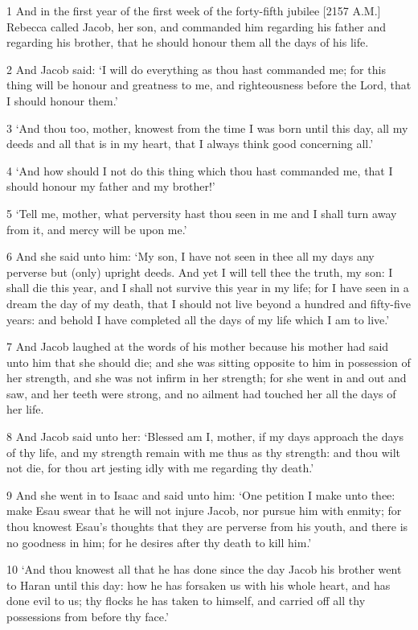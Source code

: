 \par 1 And in the first year of the first week of the forty-fifth jubilee [2157 A.M.] Rebecca called Jacob, her son, and commanded him regarding his father and regarding his brother, that he should honour them all the days of his life.
\par 2 And Jacob said: ‘I will do everything as thou hast commanded me; for this thing will be honour and greatness to me, and righteousness before the Lord, that I should honour them.’
\par 3 ‘And thou too, mother, knowest from the time I was born until this day, all my deeds and all that is in my heart, that I always think good concerning all.’
\par 4 ‘And how should I not do this thing which thou hast commanded me, that I should honour my father and my brother!’
\par 5 ‘Tell me, mother, what perversity hast thou seen in me and I shall turn away from it, and mercy will be upon me.’
\par 6 And she said unto him: ‘My son, I have not seen in thee all my days any perverse but (only) upright deeds. And yet I will tell thee the truth, my son: I shall die this year, and I shall not survive this year in my life; for I have seen in a dream the day of my death, that I should not live beyond a hundred and fifty-five years: and behold I have completed all the days of my life which I am to live.’
\par 7 And Jacob laughed at the words of his mother because his mother had said unto him that she should die; and she was sitting opposite to him in possession of her strength, and she was not infirm in her strength; for she went in and out and saw, and her teeth were strong, and no ailment had touched her all the days of her life.
\par 8 And Jacob said unto her: ‘Blessed am I, mother, if my days approach the days of thy life, and my strength remain with me thus as thy strength: and thou wilt not die, for thou art jesting idly with me regarding thy death.’
\par 9 And she went in to Isaac and said unto him: ‘One petition I make unto thee: make Esau swear that he will not injure Jacob, nor pursue him with enmity; for thou knowest Esau's thoughts that they are perverse from his youth, and there is no goodness in him; for he desires after thy death to kill him.’
\par 10 ‘And thou knowest all that he has done since the day Jacob his brother went to Haran until this day: how he has forsaken us with his whole heart, and has done evil to us; thy flocks he has taken to himself, and carried off all thy possessions from before thy face.’
